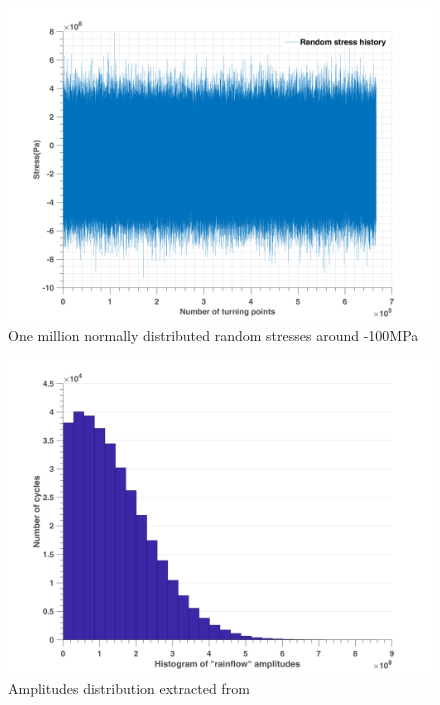 \begin{figure}[!h]
	\centering
	\includegraphics[width=\textwidth]{figures//randomdemo.png} 
	\caption{One million normally distributed random stresses around -100MPa}
	\label{randomdemo}
\end{figure}

\begin{figure}[!h]
	\centering
	\includegraphics[width=\textwidth]{figures//randomdemo_ampl.png} 
	\caption{Amplitudes distribution extracted from }
	\label{randomdemoampl}
\end{figure}

